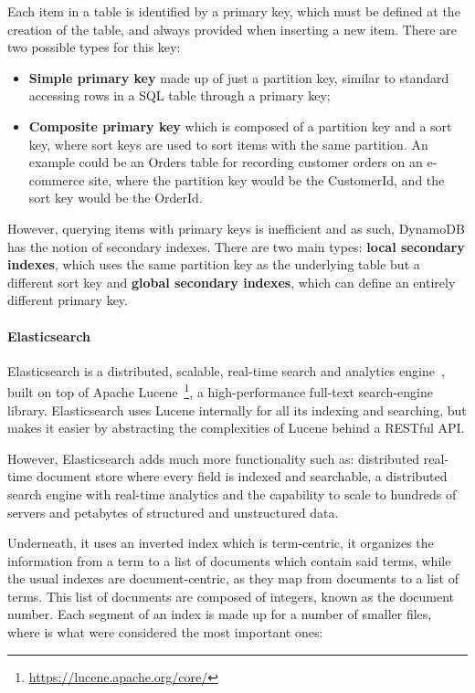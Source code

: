 Each item in a table is identified by a primary key, which must be defined at the creation of the table, and always provided when inserting a new item. There are two possible types for this key:

\begin{itemize}
    \item \textbf{Simple primary key} made up of just a partition key, similar to standard accessing rows in a SQL table through a primary key;
    \item \textbf{Composite primary key} which is composed of a partition key and a sort key, where sort keys are used to sort items with the same partition. An example could be an Orders table for recording customer orders on an e-commerce site, where the partition key would be the CustomerId, and the sort key would be the OrderId. 
\end{itemize}

However, querying items with primary keys is inefficient and as such, DynamoDB has the notion of secondary indexes. There are two main types: \textbf{local secondary indexes}, which uses the same partition key as the underlying table but a different sort key and \textbf{global secondary indexes}, which can define an entirely different primary key.

\paragraph{Elasticsearch}

Elasticsearch is a distributed, scalable, real-time search and analytics engine~\cite{elasticsearch-book}, built on top of Apache Lucene~\footnote{\url{https://lucene.apache.org/core/}}, a high-performance full-text search-engine library. Elasticsearch uses Lucene internally for all its indexing and searching, but makes it easier by abstracting the complexities of Lucene behind a RESTful API.

However, Elasticsearch adds much more functionality such as: distributed real-time document store where every field is indexed and searchable, a distributed search engine with real-time analytics and the capability to scale to hundreds of servers and petabytes of structured and unstructured data.

Underneath, it uses an inverted index which is term-centric, it organizes the information from a term to a list of documents which contain said terms, while the usual indexes are document-centric, as they map from documents to a list of terms. This list of documents are composed of integers, known as the document number. Each segment of an index is made up for a number of smaller files, where is what were considered the most important ones:

